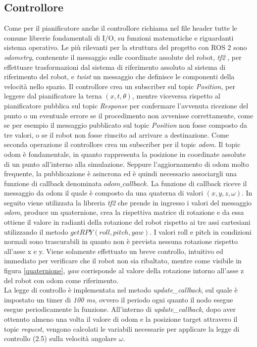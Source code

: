 \documentclass[a4paper,11 pt,oneside]{book}
\theoremstyle{definition}
\begin{document}
\subsection{Controllore}
Come per il pianificatore anche il controllore richiama nel file header tutte le comune librerie fondamentali di I/O, su funzioni matematiche e riguardanti sistema operativo. Le più rilevanti per la struttura del progetto con ROS 2 sono \emph{odometry}, contenente il messaggio sulle coordinate assolute del robot, \emph{tf2} , per effettuare trasformazioni dal sistema di riferimento assoluto al sistema di riferimento del robot, e \emph{twist} un messaggio che definisce le componenti della velocità nello spazio.
Il controllore crea un subscriber sul topic \emph{Position}, per leggere dal pianificatore la terna $(x,t, \theta)$, mentre viceversa rispetto al pianificatore pubblica sul topic \emph{Response} per confermare l'avvenuta ricezione del punto o un eventuale errore se il procedimento non avvenisse correttamente, come se per esempio il messaggio pubblicato sul topic \emph{Position} non fosse composto da tre valori, o se il robot non fosse riuscito ad arrivare a destinazione.
Come seconda operazione il controllore crea un subscriber per il topic \emph{odom}. Il topic odom è fondamentale, in quanto rappresenta la posizione in coordinate assolute di un punto all'interno alla simulazione.
Seppure l'aggiornamento di odom molto frequente, la pubblicazione è asincrona ed è quindi necessario associargli una funzione di callback denominata $odom\_callback$.
La funzione di callback riceve il messaggio da odom il quale è composto da una quaterna di valori $(x,y,z,\omega)$. In seguito viene utilizzata la libreria \emph{tf2} che prende in ingresso i valori del messaggio \emph{odom}, produce un quaternione, crea la rispettiva matrice di rotazione e da essa ottiene il valore in radianti della rotazione del robot rispetto ai tre assi cartesiani utilizzando il metodo $getRPY(roll, pitch, yaw)$. I valori roll e pitch in condizioni normali sono trascurabili in quanto non è prevista nessuna rotazione rispetto all'asse x e y. Viene solamente effettuato un breve controllo, intuitivo ed immediato per verificare che il robot non sia ribaltato, mentre come visibile in figura \ref{quaternione}, \emph{yaw} corrisponde al valore della rotazione intorno all'asse z del robot con odom come riferimento.
\\
La legge di controllo è implementata nel metodo \emph{update_callback}, sul quale è impostato un timer di \emph{100 ms}, ovvero il periodo ogni quanto il nodo esegue esegue periodicamente la funzione. All'interno di \emph{update_callback}, dopo aver ottenuto almeno una volta il valore di odom e la posizione target attravero il topic \emph{request}, vengono calcolati le variabili necessarie per applicare la legge di controllo (2.5) sulla velocità angolare $\omega$.
\end{document}
